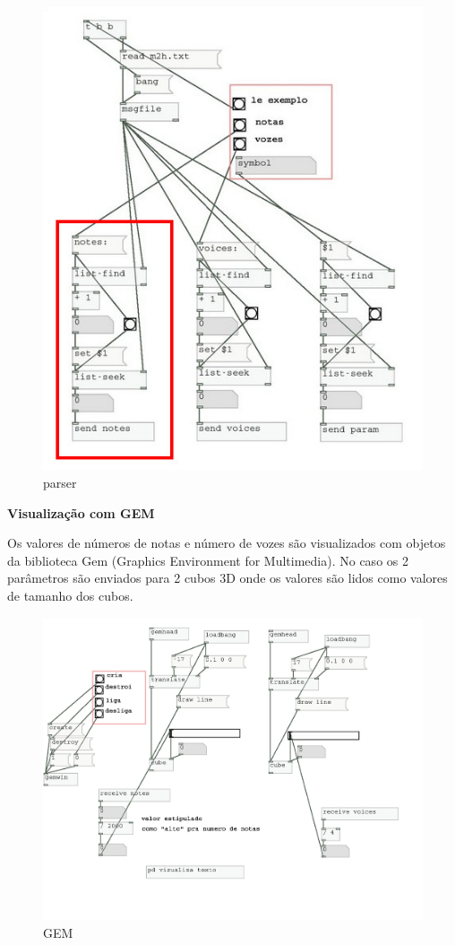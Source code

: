 \documentclass{ppgmus}
\begin{document}
\begin{figure}
\includegraphics[scale=.5]{parser00}
\caption{parser}
\label{parser}
\end{figure} 


\textbf{Visualização com GEM}


  Os valores de números de notas e número de vozes são visualizados
com objetos da biblioteca Gem (Graphics Environment for Multimedia).
No caso os 2 parâmetros são enviados para 2 cubos 3D onde os valores
são lidos como valores de tamanho dos cubos.



\begin{figure}
\includegraphics[scale=.5]{gem00}
\caption{GEM}
\label{GEM}
\end{figure} 
\end{document}
